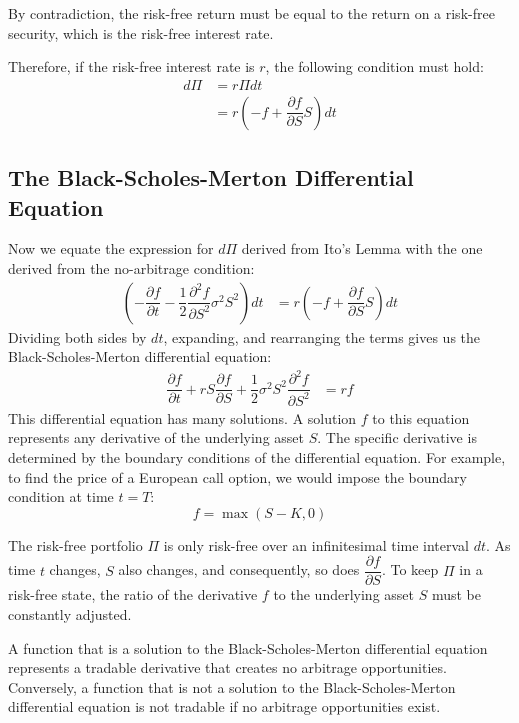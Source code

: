 \documentclass[uplatex]{jsarticle}
\begin{document}
By contradiction, the risk-free return must be equal to the return on a risk-free security, which is the risk-free interest rate.

Therefore, if the risk-free interest rate is $r$, the following condition must hold:
\begin{align}
	d \Pi & = r \Pi dt                                                   \\
	      & = r \left( - f + \dfrac{\partial f}{\partial S} S \right) dt
\end{align}

\subsection{The Black-Scholes-Merton Differential Equation}

Now we equate the expression for $d \Pi$ derived from Ito's Lemma with the one derived from the no-arbitrage condition:
\begin{align}
	\left( - \dfrac{\partial f}{\partial t} - \dfrac{1}{2} \dfrac{\partial^{2} f}{\partial S^{2}} \sigma^{2} S^{2} \right) dt & = r \left( - f + \dfrac{\partial f}{\partial S} S \right) dt
\end{align}
Dividing both sides by $dt$, expanding, and rearranging the terms gives us the Black-Scholes-Merton differential equation:
\begin{align}
	\dfrac{\partial f}{\partial t} + rS \dfrac{\partial f}{\partial S} + \dfrac{1}{2} \sigma^{2} S^{2} \dfrac{\partial^{2} f}{\partial S^{2}} & = rf
\end{align}
This differential equation has many solutions. A solution $f$ to this equation represents any derivative of the underlying asset $S$. The specific derivative is determined by the boundary conditions of the differential equation. For example, to find the price of a European call option, we would impose the boundary condition at time $t=T$:
$$
	f = \max (S-K,0)
$$

\bigskip

The risk-free portfolio $\Pi$ is only risk-free over an infinitesimal time interval $dt$. As time $t$ changes, $S$ also changes, and consequently, so does $\dfrac{\partial f}{\partial S}$. To keep $\Pi$ in a risk-free state, the ratio of the derivative $f$ to the underlying asset $S$ must be constantly adjusted.

\bigskip

A function that is a solution to the Black-Scholes-Merton differential equation represents a tradable derivative that creates no arbitrage opportunities. Conversely, a function that is not a solution to the Black-Scholes-Merton differential equation is not tradable if no arbitrage opportunities exist.
\end{document}
